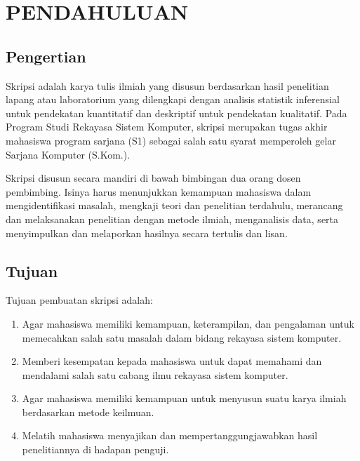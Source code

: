 \chapter{PENDAHULUAN}

\section{Pengertian}
Skripsi adalah karya tulis ilmiah yang disusun berdasarkan hasil penelitian lapang atau laboratorium yang dilengkapi dengan analisis statistik inferensial untuk pendekatan kuantitatif dan deskriptif untuk pendekatan kualitatif. Pada Program Studi Rekayasa Sistem Komputer, skripsi merupakan tugas akhir mahasiswa program sarjana (S1) sebagai salah satu syarat memperoleh gelar Sarjana Komputer (S.Kom.).

Skripsi disusun secara mandiri di bawah bimbingan dua orang dosen pembimbing. Isinya harus menunjukkan kemampuan mahasiswa dalam mengidentifikasi masalah, mengkaji teori dan penelitian terdahulu, merancang dan melaksanakan penelitian dengan metode ilmiah, menganalisis data, serta menyimpulkan dan melaporkan hasilnya secara tertulis dan lisan.

\section{Tujuan}
Tujuan pembuatan skripsi adalah:
\begin{enumerate}
\item Agar mahasiswa memiliki kemampuan, keterampilan, dan pengalaman untuk memecahkan salah satu masalah dalam bidang rekayasa sistem komputer.
\item Memberi kesempatan kepada mahasiswa untuk dapat memahami dan mendalami salah satu cabang ilmu rekayasa sistem komputer.
\item Agar mahasiswa memiliki kemampuan untuk menyusun suatu karya ilmiah berdasarkan metode keilmuan.
\item Melatih mahasiswa menyajikan dan mempertanggungjawabkan hasil penelitiannya di hadapan penguji.
\end{enumerate}

